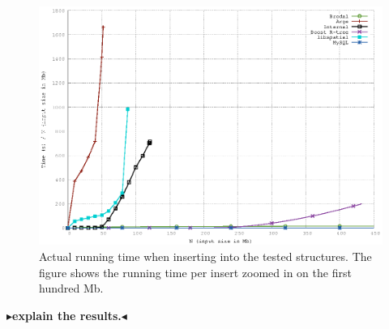 \documentclass[twoside,11pt,openright]{report}
\newcommand{\todo}[1]{{\color[rgb]{.5,0,0}\textbf{$\blacktriangleright$#1$\blacktriangleleft$}}}
\begin{document}
\begin{figure}[htp!]
\includegraphics[width=\textwidth]{../src/experiments/insert_experiment_results/2016-05-06.14_11_08/time_zoom}
\caption{Actual running time when inserting into the tested structures. The figure shows the running time per insert zoomed in on the first hundred Mb.}
\label{fig:actual_insert_time_zoomed}
\end{figure}

\todo{explain the results.}


\end{document}
